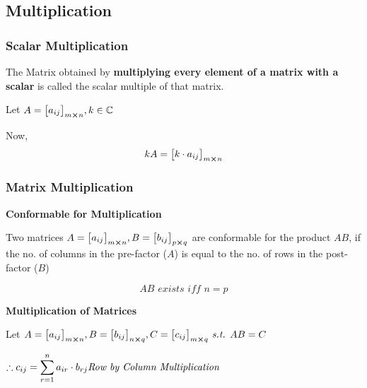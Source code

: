 \documentclass{article}
\begin{document}
\subsection{Multiplication}

\subsubsection{Scalar Multiplication}
The  Matrix obtained by \textbf{multiplying every element of a matrix with a scalar} is called the scalar multiple of that matrix.

Let $A={\begin{bmatrix}
        a_{ij}
    \end{bmatrix}}_{m \cross n}, k \in \mathbb{C}$

Now, $$kA={\begin{bmatrix}
        k \cdot a_{ij}
    \end{bmatrix}}_{m \cross n} $$

\subsubsection{Matrix Multiplication}

\textbf{Conformable for Multiplication}

Two matrices $A={\begin{bmatrix}
        a_{ij}
    \end{bmatrix}}_{m \cross n}, B={\begin{bmatrix}
                b_{ij}
            \end{bmatrix}}_{p \cross q} $ are conformable for the product $AB$, if the no. of columns in the pre-factor ($A$) is equal to the no. of rows in the post-factor ($B$)

$$AB \textit{ exists iff } n=p $$

\textbf{Multiplication of Matrices}


Let $A={\begin{bmatrix}
        a_{ij}
    \end{bmatrix}}_{m \cross n}, B={\begin{bmatrix}
                b_{ij}
            \end{bmatrix}}_{n \cross q}, C= {\begin{bmatrix}
                c_{ij}
            \end{bmatrix}}_{m \cross q} \textit{ s.t. } AB=C $

$\therefore c_{ij}=\displaystyle\sum_{r=1}^{n} a_{ir} \cdot b_{rj} \hfill \textit{Row by Column Multiplication}$
\end{document}
